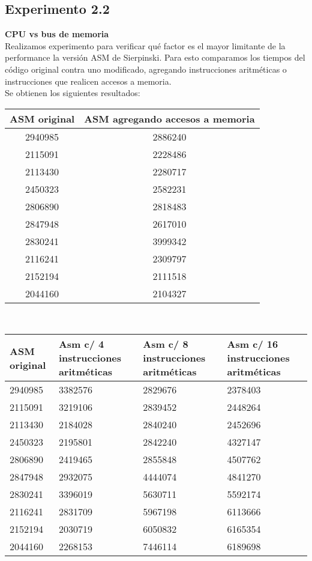 ﻿\documentclass[a4paper]{article}
\begin{document}
\newpage
\subsection{Experimento 2.2}
\textbf{CPU vs bus de memoria}\\
Realizamos experimento para verificar qué factor es el mayor limitante de la performance la versión ASM de Sierpinski.
Para esto comparamos los tiempos del código original contra uno modificado, agregando instrucciones aritméticas o instrucciones
que realicen accesos a memoria.\\
Se obtienen los siguientes resultados:\\

\begin{center}
  \begin{tabular}{| c | c |}
    \hline
      ASM original & ASM agregando accesos a memoria \\
      \hline\hline
		2940985	& 2886240  \\
		\hline
		2115091	& 2228486  \\
		\hline
		2113430	& 2280717  \\
		\hline
		2450323	& 2582231  \\
		\hline
		2806890	& 2818483  \\
		\hline
		2847948	& 2617010  \\
		\hline
		2830241	& 3999342  \\
		\hline
		2116241	& 2309797  \\
		\hline
		2152194	& 2111518  \\
		\hline
		2044160	& 2104327  \\
		\hline


  \end{tabular}
\end{center}
\ \\


\begin{center}
  \begin{tabular}{| p{3cm} | p{3cm} | p{3cm} | p{3cm} |}
    \hline
       ASM original & Asm c/ 4 instrucciones aritméticas & Asm c/ 8 instrucciones aritméticas & Asm c/ 16 instrucciones aritméticas \\
      \hline\hline
		2940985	& 3382576	& 2829676	& 2378403 \\
		\hline
		2115091	& 3219106	& 2839452	& 2448264\\
		\hline
		2113430	& 2184028	& 2840240	& 2452696\\
		\hline
		2450323	& 2195801	& 2842240	& 4327147\\
		\hline
		2806890	& 2419465	& 2855848	& 4507762\\
		\hline
		2847948	& 2932075	& 4444074	& 4841270\\
		\hline
		2830241	& 3396019	& 5630711	& 5592174\\
		\hline
		2116241	& 2831709	& 5967198	& 6113666\\
		\hline
		2152194	& 2030719	& 6050832	& 6165354\\
		\hline
		2044160	& 2268153	& 7446114	& 6189698\\
		\hline

  \end{tabular}
\end{center}
\end{document}
